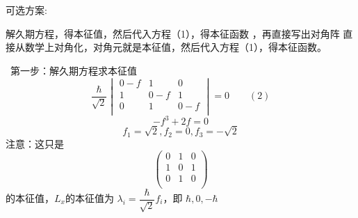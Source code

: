 \begin{frame} 
    可选方案:
    \begin{itemize}
        \done 解久期方程，得本征值，然后代入方程（1），得本征函数 ，再直接写出对角阵 
        \todo 直接从数学上对角化，对角元就是本征值，然后代入方程（1），得本征函数。
     \end{itemize}
\end{frame}

\begin{frame} 
    \解~第一步：解久期方程求本征值
    $$\frac{\hbar}{\sqrt{2}}
    \begin{vmatrix}
       0-f & 1 & 0  \\
       1 & 0-f & 1  \\
       0 & 1 & 0-f \\
    \end{vmatrix} 
    =0 \qquad (2) $$
   $$ -f^3+2f=0 $$
   $$ f_1=\sqrt{2}, f_2=0, f_3=-\sqrt{2} $$
   注意：这只是
   $$\begin{pmatrix}
       0 & 1 & 0  \\
       1 & 0 & 1  \\
       0 & 1 & 0 \\
    \end{pmatrix} $$
    的本征值，$L_x$的本征值为 $\lambda_i=\dfrac{\hbar}{\sqrt{2}} f_i$，即 $ \hbar, 0, -\hbar$
\end{frame}

